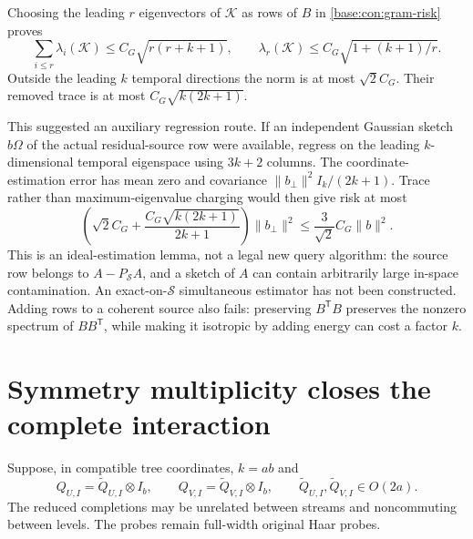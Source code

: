 \documentclass[11pt,oneside,openany,a4paper]{book}
\numberwithin{equation}{chapter}
\theoremstyle{definition}
\theoremstyle{remark}
\newcommand{\T}{\mathsf T}\newcommand{\Id}{I}
\begin{document}
Choosing the leading $r$ eigenvectors of $\mathcal K$ as rows of $B$ in \eqref{base:con:gram-risk} proves
\begin{equation}\label{base:con:KyFan}
 \sum_{i\le r}\lambda_i(\mathcal K)\le C_G\sqrt{r(r+k+1)},
 \qquad \lambda_r(\mathcal K)\le C_G\sqrt{1+(k+1)/r}.
\end{equation}
Outside the leading $k$ temporal directions the norm is at most $\sqrt2C_G$. Their removed trace is at most $C_G\sqrt{k(2k+1)}$.

This suggested an auxiliary regression route. If an independent Gaussian sketch $b\Omega$ of the actual residual-source row were available, regress on the leading $k$-dimensional temporal eigenspace using $3k+2$ columns. The coordinate-estimation error has mean zero and covariance
$\|b_\perp\|^2I_k/(2k+1)$. Trace rather than maximum-eigenvalue charging would then give risk at most
\[
 \left(\sqrt2C_G+\frac{C_G\sqrt{k(2k+1)}}{2k+1}\right)\|b_\perp\|^2
 \le\frac3{\sqrt2}C_G\|b\|^2.
\]
This is an ideal-estimation lemma, not a legal new query algorithm: the source row belongs to $A-P_{\mathcal S}A$, and a sketch of $A$ can contain arbitrarily large in-space contamination. An exact-on-$\mathcal S$ simultaneous estimator has not been constructed. Adding rows to a coherent source also fails: preserving $B^\T B$ preserves the nonzero spectrum of $BB^\T$, while making it isotropic by adding energy can cost a factor $k$.

\section{Symmetry multiplicity closes the complete interaction}\label{base:con:symmetry-multiplicity}
Suppose, in compatible tree coordinates, $k=ab$ and
\[
 Q_{U,I}=\widetilde Q_{U,I}\otimes I_b,\qquad
 Q_{V,I}=\widetilde Q_{V,I}\otimes I_b,
 \qquad\widetilde Q_{U,I},\widetilde Q_{V,I}\in O(2a).
\]
The reduced completions may be unrelated between streams and noncommuting between levels. The probes remain full-width original Haar probes.
\end{document}
